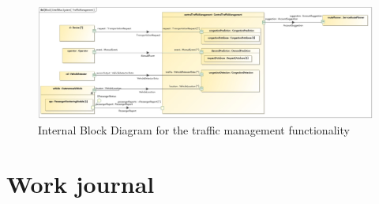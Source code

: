 \documentclass[a4paper]{article}
\begin{document}
\begin{figure}
	\centering
	\includegraphics[width=\textwidth]{ibd-trafficmanagement.jpg}
	\caption{Internal Block Diagram for the traffic management
		functionality}%
	\label{fig:ibd-trafficmanagement}
\end{figure}




\section{Work journal}
\end{document}
